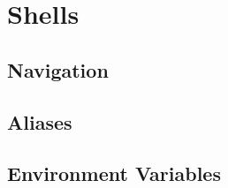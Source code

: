 \section{Shells}

\subsection{Navigation}


\subsection{Aliases}

\subsection{Environment Variables}




